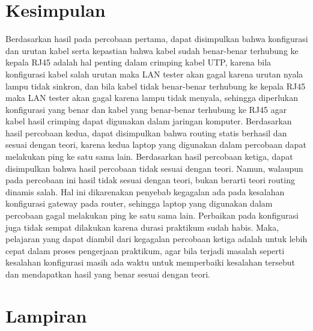 \section{Kesimpulan}
Berdasarkan hasil pada percobaan pertama, dapat disimpulkan bahwa konfigurasi dan urutan kabel serta kepastian bahwa kabel sudah benar-benar terhubung ke kepala RJ45 adalah hal penting dalam crimping kabel UTP, karena bila konfigurasi kabel salah urutan maka LAN tester akan gagal karena urutan nyala lampu tidak sinkron, dan bila kabel tidak benar-benar terhubung ke kepala RJ45 maka LAN tester akan gagal karena lampu tidak menyala, sehingga diperlukan konfigurasi yang benar dan kabel yang benar-benar terhubung ke RJ45 agar kabel hasil crimping dapat digunakan dalam jaringan komputer. Berdasarkan hasil percobaan kedua, dapat disimpulkan bahwa routing statis berhasil dan sesuai dengan teori, karena kedua laptop yang digunakan dalam percobaan dapat melakukan ping ke satu sama lain. Berdasarkan hasil percobaan ketiga, dapat disimpulkan bahwa hasil percobaan tidak sesuai dengan teori. Namun, walaupun pada percobaan ini hasil tidak sesuai dengan teori, bukan berarti teori routing dinamis salah. Hal ini dikarenakan penyebab kegagalan ada pada kesalahan konfigurasi gateway pada router, sehingga laptop yang digunakan dalam percobaan gagal melakukan ping ke satu sama lain. Perbaikan pada konfigurasi juga tidak sempat dilakukan karena durasi praktikum sudah habis. Maka, pelajaran yang dapat diambil dari kegagalan percobaan ketiga adalah untuk lebih cepat dalam proses pengerjaan praktikum, agar bila terjadi masalah seperti kesalahan konfigurasi masih ada waktu untuk memperbaiki kesalahan tersebut dan mendapatkan hasil yang benar sesuai dengan teori.

\section{Lampiran}
